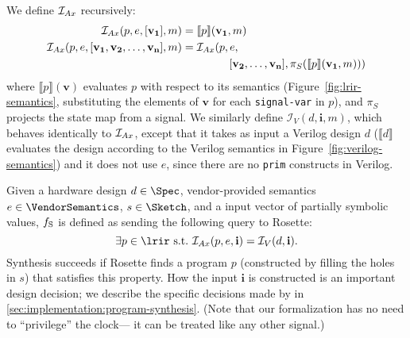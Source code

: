 

We define $\mathcal{I}_{Ax}$ recursively:
\begin{align*}
    \lrinterp(p, e, [\mathbf{v_1}], m) &= \llbracket p \rrbracket (\mathbf{v_1}, m) \\
    \lrinterp(p, e, [\mathbf{v_1}, \mathbf{v_2}, \ldots, \mathbf{v_n}], m)  &= \lrinterp(p, e, \\
    & \hspace{15mm} [\mathbf{v_2}, \ldots, \mathbf{v_n}], \pi_S(\llbracket p \rrbracket (\mathbf{v_1}, m)))
\end{align*}
  where $\llbracket p \rrbracket(\textbf{v})$ evaluates $p$ 
  with respect to its semantics 
  (Figure~\ref{fig:lrir-semantics},
  substituting the elements of $\mathbf{v}$ for each \texttt{signal-var} in $p$), and $\pi_S$ projects
  the state map from a signal.
We similarly define $\mathcal{I}_V(d, \mathbf{i}, m)$,
  which behaves identically to $\mathcal{I}_{Ax}$,
  except that it takes as input a Verilog design $d$ 
  ($\llbracket d \rrbracket$
  evaluates the design
  according to the Verilog semantics
  in Figure~\ref{fig:verilog-semantics})
  and it does not use $e$,
  since there are no
  \texttt{prim} constructs in Verilog.

Given a hardware design $d \in \Spec$,
  vendor-provided semantics $e \in \VendorSemantics$,
  $s \in \Sketch$,
  and a input vector of partially symbolic values,
  $f_{\text{S}{}}$ is defined as sending the following query to Rosette:
$$\exists p \in \lrir\ \text{s.t.}\ \lrinterp(p, e, \mathbf{i}) = \mathcal{I}_V(d, \mathbf{i}).$$
Synthesis succeeds if Rosette
  finds a program $p$ 
  (constructed by filling the holes in $s$)
  that satisfies this property.
How the input 
  $\mathbf{i}$
  is constructed 
  is an important design decision;
  we describe the specific decisions
  made by \lr
  in 
  \cref{sec:implementation:program-synthesis}.
(Note that our formalization has no need
  to ``privilege'' the clock---%
  it can be treated like any other signal.)

